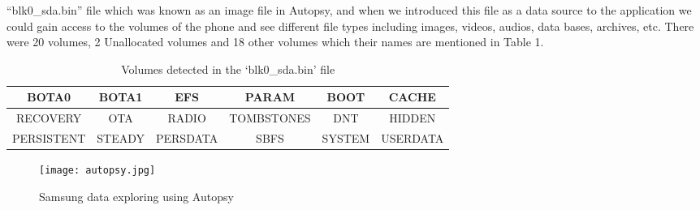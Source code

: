 \documentclass{easychair}
\begin{document}
 “blk0\_sda.bin” file which was known as an image file in Autopsy, and when we introduced this file as a data source to the application we could gain access to the volumes of the phone and see different file types including images, videos, audios, data bases, archives, etc.
There were 20 volumes, 2 Unallocated volumes and 18 other volumes which their names are mentioned in Table 1.


\begin{table*}
  \centering
    \caption{Volumes detected in the ‘blk0\_sda.bin’ file}
    \label{tab:table1}
    \begin{tabular}{c|c|c|c|c|c} 
      \hline
BOTA0		& BOTA1		& EFS		& PARAM		& BOOT		& CACHE\\
 \hline
RECOVERY	& OTA		& RADIO		& TOMBSTONES	& DNT		& HIDDEN\\
  \hline
PERSISTENT	& STEADY		& PERSDATA	& SBFS		& SYSTEM		& USERDATA\\
  \hline
    \end{tabular}
\end{table*}


\begin{figure}[h]
	\centering
		\texttt{[image: autopsy.jpg]}
	\caption{Samsung data exploring using Autopsy}
	\label{fig:autopsy}
\end{figure}
\end{document}
